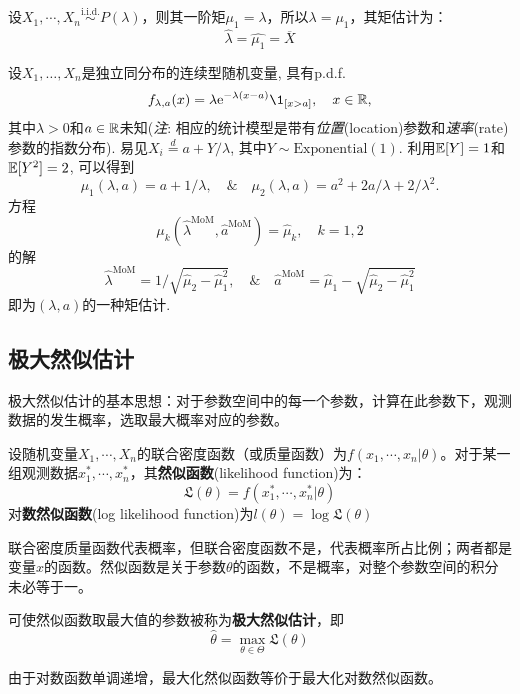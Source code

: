 \begin{example}[泊松分布的矩估计]\label{moment_estimate_Poisson}
    设$X_1, \cdots ,X_n \overset{\text{i.i.d.}}{\sim} P(\lambda)$，则其一阶矩$\mu_1=\lambda$，所以$\lambda=\mu_1$，其矩估计为：
    \[ \hat{\lambda} = \hat{\mu_1} = \overline{X} \]
\end{example}

\begin{example}
    设$X_1,\dots,X_n$是独立同分布的连续型随机变量, 具有p.d.f.
    \[ f_{\lambda,a}(x) = \lambda\mathrm{e}^{-\lambda(x-a)}\1_{[x>a]}, \quad x\in\R, \]
    其中$\lambda > 0$和$a \in \mathbb{R}$未知(\emph{注}: 相应的统计模型是带有\emph{位置}(location)参数和\emph{速率}(rate)参数的指数分布). 易见$X_i \stackrel{d}{=} a + Y/\lambda$, 其中$Y \sim \mathrm{Exponential}(1)$. 利用$\mathbb{E}[Y]=1$和$\mathbb{E}[Y^2] = 2$, 可以得到
    \[ \mu_1(\lambda,a) = a + 1/\lambda, \quad\&\quad
        \mu_2(\lambda,a) = a^2 + 2a/\lambda + 2/\lambda^2 . \]
    方程
    \[ \mu_{k}(\hat{\lambda}^{\mathrm{MoM}},\hat{a}^{\mathrm{MoM}}) = \hat{\mu}_{k}, \quad k = 1,2 \]
    的解
    \[ \hat{\lambda}^{\mathrm{MoM}} = 1\Big/\sqrt{\hat{\mu}_2-\hat{\mu}_1^2}, \quad\&\quad
        \hat{a}^{\mathrm{MoM}} = \hat{\mu}_1-\sqrt{\hat{\mu}_2-\hat{\mu}_1^2} \]
    即为$(\lambda,a)$的一种矩估计.
\end{example}

\subsection{极大然似估计}

极大然似估计的基本思想：对于参数空间中的每一个参数，计算在此参数下，观测数据的发生概率，选取最大概率对应的参数。

\begin{definition}[然似函数]
    设随机变量$X_1,\cdots ,X_n$的联合密度函数（或质量函数）为$f(x_1,\cdots ,x_n|\theta)$。对于某一组观测数据$x_1^* ,\cdots ,x_n^*$，其\textbf{然似函数}(likelihood function)为：
    \[ \mathfrak{L}(\theta) = f(x_1^* ,\cdots ,x_n^*|\theta) \]
    对\textbf{数然似函数}(log likelihood function)为$l(\theta)=\log\mathfrak{L}(\theta)$
\end{definition}
\begin{remark}
    联合密度质量函数代表概率，但联合密度函数不是，代表概率所占比例；两者都是变量$x$的函数。然似函数是关于参数$\theta$的函数，不是概率，对整个参数空间的积分未必等于一。
\end{remark}

\begin{definition}[极大然似估计]
    可使然似函数取最大值的参数被称为\textbf{极大然似估计}，即
    \[ \hat{\theta}=\max_{\theta \in \Theta}\mathfrak{L}(\theta) \]
\end{definition}
\begin{remark}
    由于对数函数单调递增，最大化然似函数等价于最大化对数然似函数。
\end{remark}

